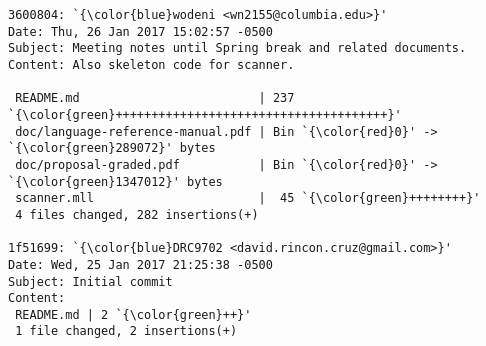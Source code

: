\begin{lstlisting}
3600804: `{\color{blue}wodeni <wn2155@columbia.edu>}'
Date: Thu, 26 Jan 2017 15:02:57 -0500
Subject: Meeting notes until Spring break and related documents.
Content: Also skeleton code for scanner.

 README.md                         | 237 `{\color{green}++++++++++++++++++++++++++++++++++++++}'
 doc/language-reference-manual.pdf | Bin `{\color{red}0}' -> `{\color{green}289072}' bytes
 doc/proposal-graded.pdf           | Bin `{\color{red}0}' -> `{\color{green}1347012}' bytes
 scanner.mll                       |  45 `{\color{green}++++++++}'
 4 files changed, 282 insertions(+)

1f51699: `{\color{blue}DRC9702 <david.rincon.cruz@gmail.com>}'
Date: Wed, 25 Jan 2017 21:25:38 -0500
Subject: Initial commit
Content: 
 README.md | 2 `{\color{green}++}'
 1 file changed, 2 insertions(+)
\end{lstlisting}
